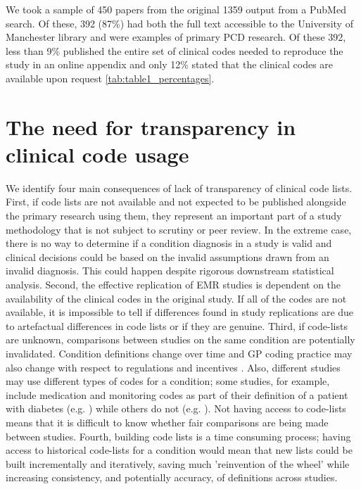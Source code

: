 \documentclass[10pt]{article}
\begin{document}
We took a sample of 450 papers from the original 1359 output from a PubMed search.  Of these, 392 (87\%) had both  the full text accessible to the University of Manchester library and were examples of primary PCD research.  Of these 392, less than 9\% published the entire set of clinical codes needed to reproduce the study in an online appendix and only 12\% stated that the clinical codes are available upon request \ref{tab:table1_percentages}.


\section*{The need for transparency in clinical code usage}


We identify four main consequences of lack of transparency of clinical code lists.  First, if code lists are not available and not expected to be published alongside the primary research using them, they represent an important part of a study methodology that is not subject to scrutiny or peer review. In the extreme case, there is no way to determine if a condition diagnosis in a study is valid and clinical decisions could be based on the invalid assumptions drawn from an invalid diagnosis.  This could happen despite rigorous downstream statistical analysis.  Second, the effective replication of EMR studies is dependent on the availability of the clinical codes in the original study.  If all of the codes are not available, it is impossible to tell if differences found in study replications are due to artefactual differences in code lists or if they are genuine.  Third, if code-lists are unknown, comparisons between studies on the same condition are potentially invalidated.  Condition definitions change over time and GP coding practice may also change with respect to regulations and incentives \cite{Calvert2009}. Also, different studies may use different types of codes for a condition; some studies, for example, include medication and monitoring codes as part of their definition of a patient with diabetes (e.g. \cite{Mulnier2006}) while others do not (e.g. \cite{Kontopantelis2014}).  Not having access to code-lists means that it is difficult to know whether fair comparisons are being made between studies. Fourth, building code lists is a time consuming process; having access to historical code-lists  for a condition would mean that new lists could be built incrementally and iteratively, saving much 'reinvention of the wheel' while increasing consistency, and potentially accuracy, of definitions across studies.
\end{document}
